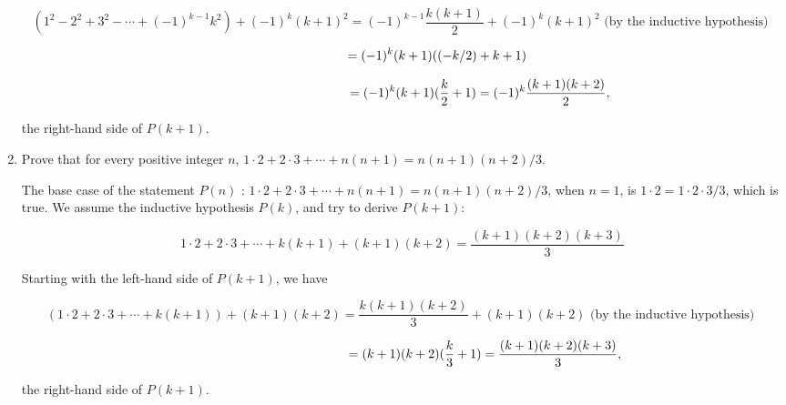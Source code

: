 \documentclass[11pt]{article}
\begin{document}
\begin{enumerate}[label=\textbf{\arabic*.}]
	\vspace{-0.8em}

	$$(1^2 - 2^2 + 3^2 - \cdots + (-1)^{k - 1}k^2) + (-1)^k(k + 1)^2 = (-1)^{k - 1}\frac{k(k + 1)}{2} + (-1)^k(k + 1)^2 \text{ (by the inductive hypothesis) }$$
	
	$$\hspace{1.9cm} = (-1)^k(k + 1)((-k / 2) + k + 1)$$
	
	$$\hspace{4.3cm} = (-1)^k(k + 1)(\frac{k}{2} + 1) = (-1)^k\frac{(k + 1)(k + 2)}{2},$$
	
	the right-hand side of $P(k + 1)$.
	
	\item Prove that for every positive integer $n$, $1 \cdot 2 + 2 \cdot 3 + \cdots + n(n + 1) = n(n + 1)(n + 2) / 3$.
	
	The base case of the statement $P(n)$ : $1 \cdot 2 + 2 \cdot 3 + \cdots + n(n + 1) = n(n + 1)(n + 2) / 3$, when $n = 1$, is $1 \cdot 2 = 1 \cdot 2 \cdot 3 / 3$, which is true. We assume the inductive hypothesis $P(k)$, and try to derive $P(k + 1)$:
	
	$$1 \cdot 2 + 2 \cdot 3 + \cdots + k(k + 1) + (k + 1)(k + 2) = \frac{(k + 1)(k + 2)(k + 3)}{3}$$
	
	Starting with the left-hand side of $P(k + 1)$, we have
	
	$$(1 \cdot 2 + 2 \cdot 3 + \cdots + k(k + 1)) + (k + 1)(k + 2) = \frac{k(k + 1)(k + 2)}{3} + (k + 1)(k + 2) \text{ (by the inductive hypothesis) }$$
	
	$$\hspace{4.6cm} = (k + 1)(k + 2)(\frac{k}{3} + 1) = \frac{(k + 1)(k + 2)(k + 3)}{3},$$
	
	the right-hand side of $P(k + 1)$.
\end{enumerate}
\end{document}
